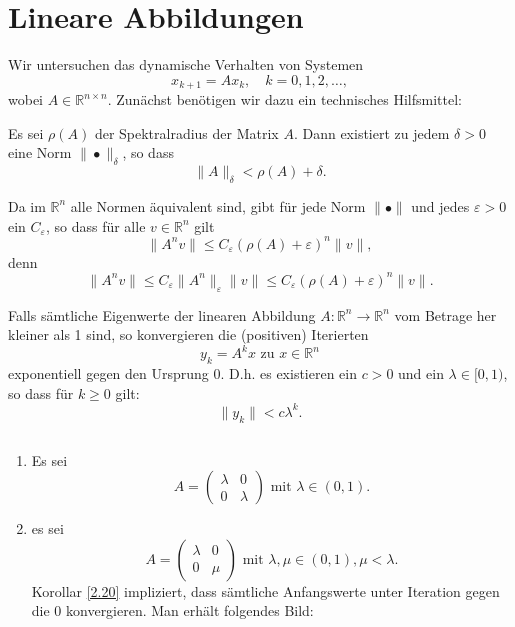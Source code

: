 \documentclass[main.tex]{subfiles}
\begin{document}
\section{Lineare Abbildungen}
\label{section:2.5}
Wir untersuchen das dynamische Verhalten von Systemen
\begin{equation}
\label{eqn:2.8}
x_{k+1} = Ax_k, \quad k=0,1,2,…,
\end{equation}
wobei $A \in ℝ^{n\times n}$. 
Zunächst benötigen wir dazu ein technisches Hilfsmittel:

\setcounter{satz}{17}
\begin{satz}\label{2.18}
Es sei $ρ(A)$ der Spektralradius der Matrix $A$. Dann existiert zu jedem $δ>0$ eine Norm $\| • \|_δ$, so dass 
$$\|A\|_δ < ρ(A) + δ.$$
\end{satz}
\begin{bem}\label{2.19}
Da im $ℝ^n$ alle Normen äquivalent sind, gibt für jede Norm $\|•\|$ und jedes $ε>0$ ein $C_ε$, so dass für alle $v\in ℝ^n$ gilt
\begin{equation}
\label{2.19}
\| A^n v \| \le C_ε \left( ρ(A) + ε \right)^n \| v \|,
\end{equation}
denn 
$$\| A^n v\| \le C_ε\| A^n \|_ε \| v \| \le C_ε \left( ρ(A) + ε \right)^n \| v\|.$$
\end{bem}

\begin{korollar}\label{2.20}
Falls sämtliche Eigenwerte der linearen Abbildung $A\colon ℝ^n\to ℝ^n$ vom Betrage her kleiner als 1 sind, so konvergieren die (positiven) Iterierten 
$$y_k = A^k x \text{ zu $x\in ℝ^n$}$$
exponentiell gegen den Ursprung 0. 
D.h. es existieren ein $c>0$ und ein $λ\in [0,1)$, so dass für $k\ge 0$ gilt:
$$\|y_k \|< cλ^k.$$
\end{korollar}

\begin{bsp}\label{2.21}
$ $\\[-1em]
\begin{enumerate}
[label=(\alph*)]
\item Es sei 
$$A = \begin{pmatrix}
λ & 0\\ 0& λ
\end{pmatrix} \text{ mit $λ\in (0,1)$.}$$
\item es sei 
$$A = \begin{pmatrix}
λ & 0
\\0 & μ
\end{pmatrix}\text{ mit $λ,μ\in (0,1), μ< λ$.}$$
Korollar \ref{2.20} impliziert, dass sämtliche Anfangswerte unter Iteration gegen die $0$ konvergieren. Man erhält folgendes Bild:

\begin{center}

\end{center}
\end{enumerate}
\end{bsp}
\end{document}
